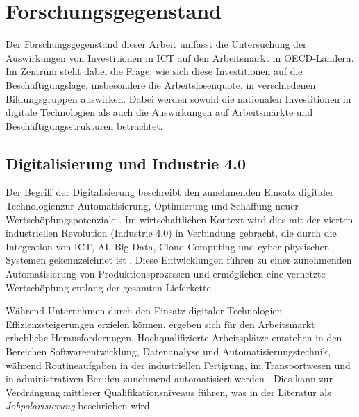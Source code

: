 

\section{Forschungsgegenstand}

Der Forschungsgegenstand dieser Arbeit umfasst die Untersuchung der Auswirkungen von 
Investitionen in \ac{ICT} auf den Arbeitsmarkt in \ac{OECD}-Ländern. Im Zentrum steht 
dabei die Frage, wie sich diese Investitionen auf die Beschäftigungslage, insbesondere 
die Arbeitslosenquote, in verschiedenen Bildungsgruppen auswirken. Dabei werden sowohl 
die nationalen Investitionen in digitale Technologien als auch die Auswirkungen auf 
Arbeitsmärkte und Beschäftigungsstrukturen betrachtet.



\subsection{Digitalisierung und Industrie 4.0}

Der Begriff der Digitalisierung beschreibt den zunehmenden Einsatz digitaler 
Technologienzur Automatisierung, Optimierung und Schaffung neuer Wertschöpfungspotenziale
\parencite[vgl.][S. 6]{brennen2016theinternational}. Im wirtschaftlichen Kontext wird 
dies mit der vierten industriellen Revolution (Industrie 4.0) in Verbindung gebracht, 
die durch die Integration von \ac{ICT}, \ac{AI}, Big Data, Cloud Computing und 
cyber-physischen Systemen gekennzeichnet ist 
\parencite[vgl.][S. 13–14]{kagermann2013recommendations}. Diese Entwicklungen führen zu 
einer zunehmenden Automatisierung von Produktionsprozessen und ermöglichen eine 
vernetzte Wertschöpfung entlang der gesamten Lieferkette.

Während Unternehmen durch den Einsatz digitaler Technologien Effizienzsteigerungen 
erzielen können, ergeben sich für den Arbeitsmarkt erhebliche Herausforderungen. 
Hochqualifizierte Arbeitsplätze entstehen in den Bereichen Softwareentwicklung, 
Datenanalyse und Automatisierungstechnik, während Routineaufgaben in der industriellen 
Fertigung, im Transportwesen und in administrativen Berufen zunehmend automatisiert 
werden \parencite[vgl.][S. 36–37]{frey2013thefuture}. Dies kann zur Verdrängung mittlerer
Qualifikationsniveaus führen, was in der Literatur als \textit{Jobpolarisierung} 
beschrieben wird.

